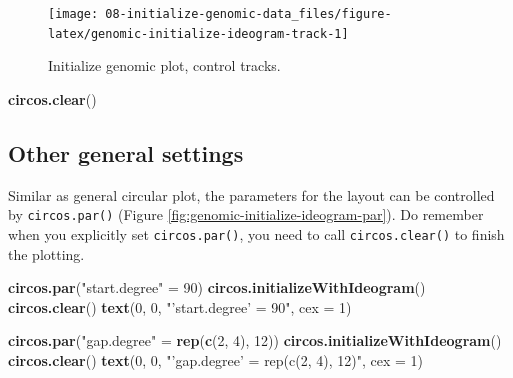 \documentclass[]{book}
\newenvironment{Shaded}{\begin{snugshade}}{\end{snugshade}}
\newcommand{\KeywordTok}[1]{\textcolor[rgb]{0.13,0.29,0.53}{\textbf{#1}}}
\newcommand{\DataTypeTok}[1]{\textcolor[rgb]{0.13,0.29,0.53}{#1}}
\newcommand{\DecValTok}[1]{\textcolor[rgb]{0.00,0.00,0.81}{#1}}
\newcommand{\StringTok}[1]{\textcolor[rgb]{0.31,0.60,0.02}{#1}}
\newcommand{\NormalTok}[1]{#1}
\begin{document}
\begin{figure}

{\centering \texttt{[image: 08-initialize-genomic-data\_files/figure-latex/genomic-initialize-ideogram-track-1]} 

}

\caption{Initialize genomic plot, control tracks.}\label{fig:genomic-initialize-ideogram-track}
\end{figure}

\begin{Shaded}
\begin{Highlighting}[]
\KeywordTok{circos.clear}\NormalTok{()}
\end{Highlighting}
\end{Shaded}

\subsection{Other general settings}\label{other-general-settings}

Similar as general circular plot, the parameters for the layout can be
controlled by \texttt{circos.par()} (Figure
\ref{fig:genomic-initialize-ideogram-par}). Do remember when you
explicitly set \texttt{circos.par()}, you need to call
\texttt{circos.clear()} to finish the plotting.

\begin{Shaded}
\begin{Highlighting}[]
\KeywordTok{circos.par}\NormalTok{(}\StringTok{"start.degree"}\NormalTok{ =}\StringTok{ }\DecValTok{90}\NormalTok{)}
\KeywordTok{circos.initializeWithIdeogram}\NormalTok{()}
\KeywordTok{circos.clear}\NormalTok{()}
\KeywordTok{text}\NormalTok{(}\DecValTok{0}\NormalTok{, }\DecValTok{0}\NormalTok{, }\StringTok{"'start.degree' = 90"}\NormalTok{, }\DataTypeTok{cex =} \DecValTok{1}\NormalTok{)}

\KeywordTok{circos.par}\NormalTok{(}\StringTok{"gap.degree"}\NormalTok{ =}\StringTok{ }\KeywordTok{rep}\NormalTok{(}\KeywordTok{c}\NormalTok{(}\DecValTok{2}\NormalTok{, }\DecValTok{4}\NormalTok{), }\DecValTok{12}\NormalTok{))}
\KeywordTok{circos.initializeWithIdeogram}\NormalTok{()}
\KeywordTok{circos.clear}\NormalTok{()}
\KeywordTok{text}\NormalTok{(}\DecValTok{0}\NormalTok{, }\DecValTok{0}\NormalTok{, }\StringTok{"'gap.degree' = rep(c(2, 4), 12)"}\NormalTok{, }\DataTypeTok{cex =} \DecValTok{1}\NormalTok{)}
\end{Highlighting}
\end{Shaded}
\end{document}
